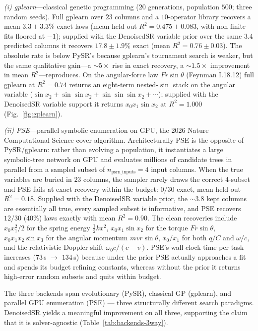 \documentclass[11pt]{article}
\begin{document}
\emph{(i) gplearn\cite{stephens2015gplearn}}---classical genetic programming
($20$ generations, population $500$; three random seeds). Full gplearn over $23$
columns and a $10$-operator library recovers a mean $3.3{\pm}3.3\%$ exact laws
(mean held-out $R^2=0.475{\pm}0.083$, with non-finite fits floored at $-1$);
supplied with the DenoisedSR variable prior over the same $3.4$ predicted
columns it recovers $17.8{\pm}1.9\%$ exact (mean $R^2=0.76{\pm}0.03$). The
absolute rate is below PySR's because gplearn's tournament search is weaker,
but the same qualitative gain---a $\sim$$5\times$ rise in exact recovery, a
$\sim$$1.5\times$ improvement in mean $R^2$---reproduces. On the angular-force
law $F r \sin\theta$ (Feynman I.18.12) full gplearn at $R^2{=}0.74$ returns an
eight-term nested-$\sin$ stack on the angular variable ($\sin x_2{+}\sin\sin
x_2{+}\sin\sin\sin x_2{+}\cdots$); supplied with the DenoisedSR variable
support it returns $x_0 x_1 \sin x_2$ at $R^2{=}1.000$ (Fig.~\ref{fig:gplearn}).

\emph{(ii) PSE\cite{ruan2026pse}}---parallel symbolic enumeration on GPU, the
2026 Nature Computational Science cover algorithm. Architecturally PSE is the
opposite of PySR/gplearn: rather than evolving a population, it instantiates a
large symbolic-tree network on GPU and evaluates millions of candidate trees
in parallel from a sampled subset of $n_{\mathrm{psrn\_inputs}}{=}4$ input
columns. When the true variables are buried in $23$ columns, the sampler
rarely draws the correct $4$-subset and PSE fails at exact recovery within the
budget: $0/30$ exact, mean held-out $R^2=0.18$. Supplied with the DenoisedSR
variable prior, the $\sim$$3.8$ kept columns are essentially all true, every
sampled subset is informative, and PSE recovers $12/30$ ($40\%$) laws exactly
with mean $R^2=0.90$. The clean recoveries include
$x_0 x_1^2/2$ for the spring energy $\frac12 k x^2$,
$x_0 x_1 \sin x_2$ for the torque $F r \sin\theta$,
$x_0 x_1 x_2 \sin x_3$ for the angular momentum $m v r \sin\theta$,
$x_0/x_1$ for both $q/C$ and $\omega/c$, and the relativistic Doppler shift
$\omega_0 c/(c{-}v)$. PSE's wall-clock time per task increases ($73$\,s
$\to$ $134$\,s) because under the prior PSE actually approaches a fit and
spends its budget refining constants, whereas without the prior it returns
high-error random subsets and quits within budget.

The three backends span evolutionary (PySR), classical GP (gplearn), and
parallel GPU enumeration (PSE) — three structurally different search
paradigms. DenoisedSR yields a meaningful improvement on all three, supporting
the claim that it is solver-agnostic (Table~\ref{tab:backends-3way}).
\end{document}
